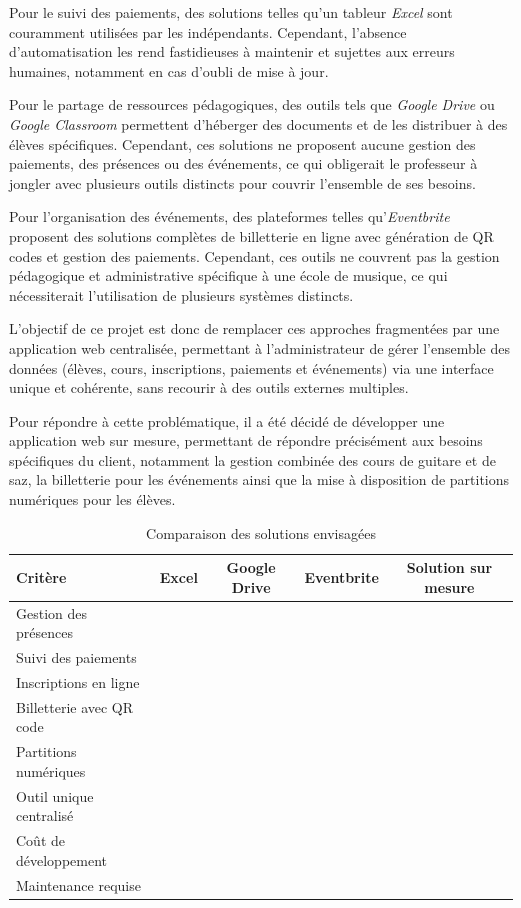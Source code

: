 \documentclass{article}
\newcommand{\cmark}{\ding{51}}
\newcommand{\xmark}{\ding{55}}
\begin{document}
Pour le suivi des paiements, des solutions telles qu'un tableur 
\textit{Excel} sont couramment utilisées par les indépendants. 
Cependant, l'absence d'automatisation les rend fastidieuses à 
maintenir et sujettes aux erreurs humaines, notamment en cas 
d'oubli de mise à jour.

Pour le partage de ressources pédagogiques, des outils tels que 
\textit{Google Drive} ou \textit{Google Classroom} permettent 
d'héberger des documents et de les distribuer à des élèves 
spécifiques. Cependant, ces solutions ne proposent aucune gestion 
des paiements, des présences ou des événements, ce qui obligerait 
le professeur à jongler avec plusieurs outils distincts pour 
couvrir l'ensemble de ses besoins.

Pour l'organisation des événements, des plateformes telles 
qu'\textit{Eventbrite} proposent des solutions complètes de 
billetterie en ligne avec génération de QR codes et gestion 
des paiements. Cependant, ces outils ne couvrent pas la gestion 
pédagogique et administrative spécifique à une école de musique, 
ce qui nécessiterait l'utilisation de plusieurs systèmes distincts.

L'objectif de ce projet est donc de remplacer ces approches 
fragmentées par une application web centralisée, permettant à 
l'administrateur de gérer l'ensemble des données (élèves, cours, 
inscriptions, paiements et événements) via une interface unique 
et cohérente, sans recourir à des outils externes multiples.

Pour répondre à cette problématique, il a été décidé de développer 
une application web sur mesure, permettant de répondre précisément 
aux besoins spécifiques du client, notamment la gestion combinée 
des cours de guitare et de saz, la billetterie pour les événements 
ainsi que la mise à disposition de partitions numériques pour les élèves.

\begin{table}[H]
\centering
\begin{tabular}{lcccc}
\toprule
\textbf{Critère} & \textbf{Excel} & \textbf{Google Drive} & 
\textbf{Eventbrite} & \textbf{Solution sur mesure} \\
\midrule
Gestion des présences     & \cmark & \xmark & \xmark & \cmark \\
Suivi des paiements       & \cmark & \xmark & \xmark & \cmark \\
Inscriptions en ligne     & \xmark & \xmark & \xmark & \cmark \\
Billetterie avec QR code  & \xmark & \xmark & \cmark & \cmark \\
Partitions numériques     & \xmark & \cmark & \xmark & \cmark \\
Outil unique centralisé   & \xmark & \xmark & \xmark & \cmark \\
Coût de développement     & \cmark & \cmark & \cmark & \xmark \\
Maintenance requise       & \cmark & \cmark & \cmark & \xmark \\
\bottomrule
\end{tabular}
\caption{Comparaison des solutions envisagées}
\end{table}
\end{document}
